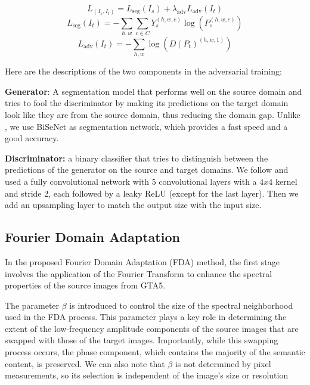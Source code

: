 \documentclass[10pt,twocolumn,letterpaper]{article}
\begin{document}
\begin{equation}
L_(I_s,I_t) =L_{\text{seg}}(I_s) + \lambda_{\text{adv}} L_{\text{adv}}(I_t)
\label{eq:domAd_total_loss}
\end{equation}
\begin{equation}
L_{\text{seg}}(I_t) = -\sum_{h,w} \sum_{c \in C} Y_s^{(h,w,c)} \log(P_s^{(h,w,c)})
\label{eq:domAd_cross_entropy}
\end{equation}
\begin{equation}
L_{\text{adv}}(I_t) = -\sum_{h,w} \log(D(P_t)^{(h,w,1)})
\label{eq:domAd_adversarial_loss}
\end{equation}

Here are the descriptions of the two components in the adversarial training:

\textbf{Generator}: A segmentation model that performs well on the source domain and tries to fool the discriminator by making its predictions on the target domain look like they are from the source domain, thus reducing the domain gap. Unlike \cite{DomAd}, we use BiSeNet as segmentation network, which provides a fast speed and a good accuracy.

\textbf{Discriminator:} a binary classifier that tries to distinguish between the predictions of the generator on the source and target domains. We follow \cite{DomAd} and used a fully convolutional network with 5 convolutional layers with a $4x4$ kernel and stride 2, each followed by a leaky ReLU (except for the last layer). Then we add an upsampling layer to match the output size with the input size.


\subsection{Fourier Domain Adaptation}

In the proposed Fourier Domain Adaptation (FDA) method\cite{fda}, the first stage involves the application of the Fourier Transform to enhance the spectral properties of the source images from GTA5.

The parameter $\beta$ is introduced to control the size of the spectral neighborhood used in the FDA process. This parameter plays a key role in determining the extent of the low-frequency amplitude components of the source images that are swapped with those of the target images. Importantly, while this swapping process occurs, the phase component, which contains the majority of the semantic content, is preserved. We can also note that $\beta$ is not determined by pixel measurements, so its selection is independent of the image’s size or resolution
\end{document}
